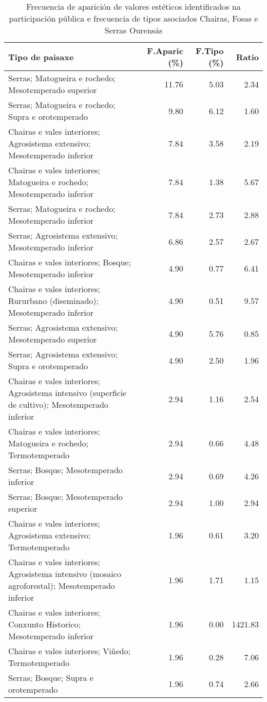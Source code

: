\begin{table}[p]
\centering
\caption{Frecuencia de aparición de valores estéticos identificados na participación pública e frecuencia de tipos asociados Chairas, Fosas e Serras Ourensás} 
\label{vsixotest8}
\begin{tabular}{lrrr}
  \hline
Tipo de paisaxe & F.Aparic (\%) & F.Tipo (\%) & Ratio \\ 
  \hline
Serras; Matogueira e rochedo; Mesotemperado superior & 11.76 & 5.03 & 2.34 \\ 
  Serras; Matogueira e rochedo; Supra e orotemperado & 9.80 & 6.12 & 1.60 \\ 
  Chairas e vales interiores; Agrosistema extensivo; Mesotemperado inferior & 7.84 & 3.58 & 2.19 \\ 
  Chairas e vales interiores; Matogueira e rochedo; Mesotemperado inferior & 7.84 & 1.38 & 5.67 \\ 
  Serras; Matogueira e rochedo; Mesotemperado inferior & 7.84 & 2.73 & 2.88 \\ 
  Serras; Agrosistema extensivo; Mesotemperado inferior & 6.86 & 2.57 & 2.67 \\ 
  Chairas e vales interiores; Bosque; Mesotemperado inferior & 4.90 & 0.77 & 6.41 \\ 
  Chairas e vales interiores; Rururbano (diseminado); Mesotemperado inferior & 4.90 & 0.51 & 9.57 \\ 
  Serras; Agrosistema extensivo; Mesotemperado superior & 4.90 & 5.76 & 0.85 \\ 
  Serras; Agrosistema extensivo; Supra e orotemperado & 4.90 & 2.50 & 1.96 \\ 
  Chairas e vales interiores; Agrosistema intensivo (superficie de cultivo); Mesotemperado inferior & 2.94 & 1.16 & 2.54 \\ 
  Chairas e vales interiores; Matogueira e rochedo; Termotemperado & 2.94 & 0.66 & 4.48 \\ 
  Serras; Bosque; Mesotemperado inferior & 2.94 & 0.69 & 4.26 \\ 
  Serras; Bosque; Mesotemperado superior & 2.94 & 1.00 & 2.94 \\ 
  Chairas e vales interiores; Agrosistema extensivo; Termotemperado & 1.96 & 0.61 & 3.20 \\ 
  Chairas e vales interiores; Agrosistema intensivo (mosaico agroforestal); Mesotemperado inferior & 1.96 & 1.71 & 1.15 \\ 
  Chairas e vales interiores; Conxunto Historico; Mesotemperado inferior & 1.96 & 0.00 & 1421.83 \\ 
  Chairas e vales interiores; Viñedo; Termotemperado & 1.96 & 0.28 & 7.06 \\ 
  Serras; Bosque; Supra e orotemperado & 1.96 & 0.74 & 2.66 \\ 
   \hline
\end{tabular}
\end{table}
